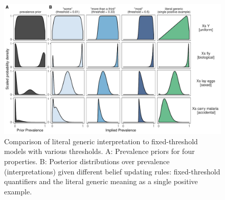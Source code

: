 \documentclass[floatsintext,doc]{apa6}
\begin{document}
\begin{figure}
\centering
\includegraphics{figs/modelSimulations-noPrag.pdf}
\caption{\label{fig:modelSimulations}Comparison of literal generic interpretation to fixed-threshold models with various thresholds. A: Prevalence priors for four properties. B: Posterior distributions over prevalence (interpretations) given different belief updating rules: fixed-threshold quantifiers and the literal generic meaning as a single positive example.}
\end{figure}




\end{document}
